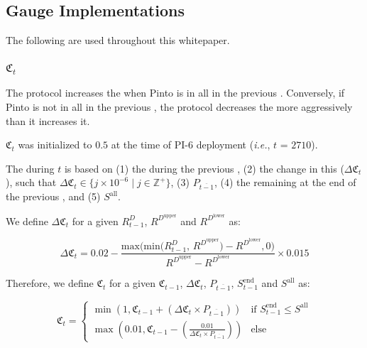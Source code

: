 \documentclass[class=article, crop=false]{standalone}
\begin{document}

\subsection{Gauge Implementations}

The following  are used throughout this whitepaper.


\subsubsection{$\mathfrak{C}_{t}$}

The protocol increases the  when Pinto is  in all  in the previous . Conversely, if Pinto is not  in all  in the previous , the protocol decreases the  more aggressively than it increases it.

$\mathfrak{C}_{t}$ was initialized to $0.5$ at the time of PI-6 deployment (\textit{i.e.}, $t$ = $2710$).

The  during $t$ is based on (1) the  during the previous , (2) the change in  this  ($\Delta \mathfrak{C}_{t}$), such that $\Delta \mathfrak{C}_{t} \in \{j \times 10^{-6} \mid j \in \mathbb{Z}^{+} \}$, (3) $P_{\overline{t-1}}$, (4) the  remaining at the end of the previous , and (5) $S^{\text{all}}$.

We define $\Delta \mathfrak{C}_{t}$ for a given $R_{t-1}^{D}$, $R^{D^{\text{upper}}}$ and $R^{D^{\text{lower}}}$ as:

    $$
        \Delta \mathfrak{C}_{t} =
            0.02 - \frac{\text{max(min($R_{t-1}^{D}$, $R^{D^{\text{upper}}}$)} - \text{$R^{D^{\text{lower}}}$}, 0)} {\text{$R^{D^{\text{upper}}}$} - \text{$R^{D^{\text{lower}}}$}} \times 0.015
    $$

Therefore, we define $\mathfrak{C}_{t}$ for a given $\mathfrak{C}_{t-1}$, $\Delta \mathfrak{C}_{t}$, $P_{\overline{t-1}}$, $S_{t-1}^{\text{end}}$ and $S^{\text{all}}$ as:

    $$
        \mathfrak{C}_{t} = 
            \begin{cases}     
            \min(1, \mathfrak{C}_{t-1} + (\Delta \mathfrak{C}_{t} \times P_{\overline{t-1}})) 
                & \text{if } S_{t-1}^{\text{end}} \leq S^{\text{all}} \\  
                
            \max(0.01, \mathfrak{C}_{t-1} - (\frac{0.01}{\Delta \mathfrak{C}_{t} \times P_{\overline{t-1}}})) 
                & \text{else}
            \end{cases}
    $$
\end{document}
